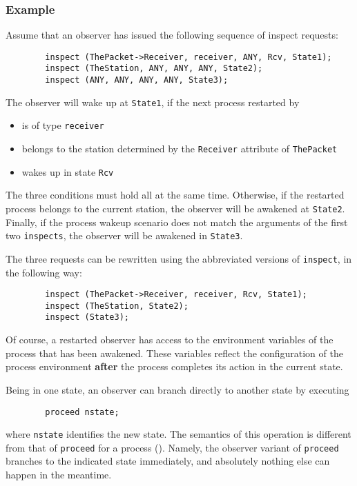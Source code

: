 \subsubsection*{Example}

\noindent
Assume that an observer has issued the following
sequence of inspect requests:
\begin{verbatim}
        inspect (ThePacket->Receiver, receiver, ANY, Rcv, State1);
        inspect (TheStation, ANY, ANY, ANY, State2);
        inspect (ANY, ANY, ANY, ANY, State3);
\end{verbatim}

The observer will wake up at {\tt State1}, if the next process
restarted by \smurph
\begin{itemize}
\item
is of type {\tt receiver}
\item
belongs to the station determined
by the {\tt Receiver} attribute of {\tt ThePacket}
\item
wakes up in state {\tt Rcv}
\end{itemize}
The three conditions must hold all at the same time.
Otherwise, if the restarted process belongs to the
current station, the observer will be awakened at {\tt State2}.
Finally, if the process wakeup scenario does not match
the arguments of the first two {\tt inspects}, the observer will be
awakened in {\tt State3}.

The three requests can be rewritten using the abbreviated versions of
{\tt inspect}, in the following way:
\begin{verbatim}
        inspect (ThePacket->Receiver, receiver, Rcv, State1);
        inspect (TheStation, State2);
        inspect (State3);
\end{verbatim}

\medskip

\noindent
Of course, a restarted observer has access to the environment variables of
the process that has been awakened.
These variables reflect
the configuration of the process environment {\bf after} the process completes
its action in the current state.

Being in one state,
an observer can branch directly to another state by executing
\begin{verbatim}
        proceed nstate;
\end{verbatim}
where {\tt nstate} identifies the new state.
The semantics of this operation is different from that of {\tt proceed}
for a process ().
Namely, the observer variant of
{\tt proceed} branches to the indicated state immediately, and absolutely
nothing else can happen in the meantime.

